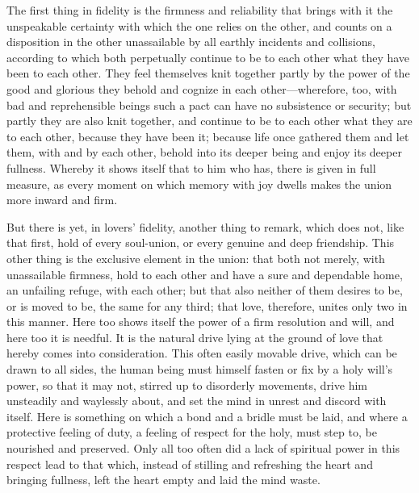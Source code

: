 \documentclass[12pt,a4paper]{book}
\begin{document}
The first thing in fidelity is the firmness and reliability that brings
with it the unspeakable certainty with which the one relies on the other,
and counts on a disposition in the other unassailable by all earthly
incidents and collisions, according to which both perpetually continue to
be to each other what they have been to each other. They feel themselves
knit together partly by the power of the good and glorious they behold and
cognize in each other---wherefore, too, with bad and reprehensible beings
such a pact can have no subsistence or security; but partly they are also
knit together, and continue to be to each other what they are to each
other, because they have been it; because life once gathered them and let
them, with and by each other, behold into its deeper being and enjoy its
deeper fullness. Whereby it shows itself that to him who has, there is given
in full measure, as every moment on which memory with joy dwells makes the
union more inward and firm.

But there is yet, in lovers' fidelity, another thing to remark, which does
not, like that first, hold of every soul-union, or every genuine and deep
friendship. This other thing is the exclusive element in the union: that
both not merely, with unassailable firmness, hold to each other and have a
sure and dependable home, an unfailing refuge, with each other; but that
also neither of them desires to be, or is moved to be, the same for any
third; that love, therefore, unites only two in this manner. Here too
shows itself the power of a firm resolution and will, and here too it is
needful. It is the natural drive lying at the ground of love that hereby
comes into consideration. This often easily movable drive, which can be
drawn to all sides, the human being must himself fasten or fix by a holy
will's power, so that it may not, stirred up to disorderly movements, drive
him unsteadily and waylessly about, and set the mind in unrest and discord
with itself. Here is something on which a bond and a bridle must be laid,
and where a protective feeling of duty, a feeling of respect for the holy,
must step to, be nourished and preserved. Only all too often did a lack of
spiritual power in this respect lead to that which, instead of stilling and
refreshing the heart and bringing fullness, left the heart empty and laid
the mind waste.
\end{document}
